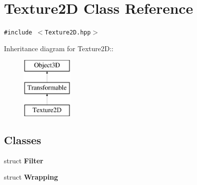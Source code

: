\hypertarget{classm3g_1_1Texture2D}{
\section{Texture2D Class Reference}
\label{classm3g_1_1Texture2D}
}
{\tt \#include $<$Texture2D.hpp$>$}

Inheritance diagram for Texture2D::\begin{figure}[H]
\begin{center}
\leavevmode
\includegraphics[height=3cm]{classm3g_1_1Texture2D}
\end{center}
\end{figure}
\subsection*{Classes}
\begin{CompactItemize}
\item 
struct \textbf{Filter}
\item 
struct \textbf{Wrapping}
\end{CompactItemize}

